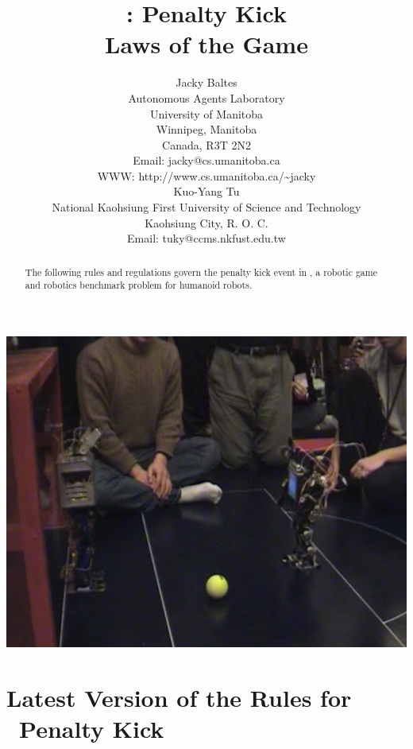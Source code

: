 \documentclass[12pt]{hurocup}
\begin{document}
\title{\HuroCup: Penalty Kick\\
  Laws of the Game \thisyear}


\author{Jacky Baltes\\
Autonomous Agents Laboratory\\
University of Manitoba\\
Winnipeg, Manitoba\\
Canada, R3T 2N2\\
Email: jacky@cs.umanitoba.ca\\
WWW: http://www.cs.umanitoba.ca/\~{ }jacky\\[5mm]
Kuo-Yang Tu\\
National Kaohsiung First University of Science and Technology\\
Kaohsiung City, R. O. C.\\
Email: tuky@ccms.nkfust.edu.tw\\
}

\maketitle

\begin{center}
 \includegraphics[width=0.7\linewidth]{Figures/penalty-kick-life}
\end{center}

\begin{abstract}
The following rules and regulations govern the penalty kick event in
\HuroCup, a robotic game and robotics benchmark problem for humanoid
robots.
\end{abstract}

\section*{Latest Version of the Rules for \HuroCup\ Penalty Kick}
\label{sec:updates}
\end{document}
